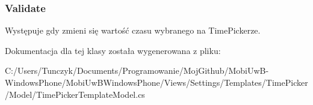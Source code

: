 \subsubsection[{Validate}]{ Validate}\label{a00074_a2415c89311ea79e73e9c21b7d5210f26}


Występuje gdy zmieni się wartość czasu wybranego na Time\+Pickerze. 



Dokumentacja dla tej klasy została wygenerowana z pliku\+:\begin{DoxyCompactItemize}
\item 
C\+:/\+Users/\+Tunczyk/\+Documents/\+Programowanie/\+Moj\+Github/\+Mobi\+Uw\+B-\/\+Windows\+Phone/\+Mobi\+Uw\+B\+Windows\+Phone/\+Views/\+Settings/\+Templates/\+Time\+Picker/\+Model/Time\+Picker\+Template\+Model.\+cs\end{DoxyCompactItemize}
